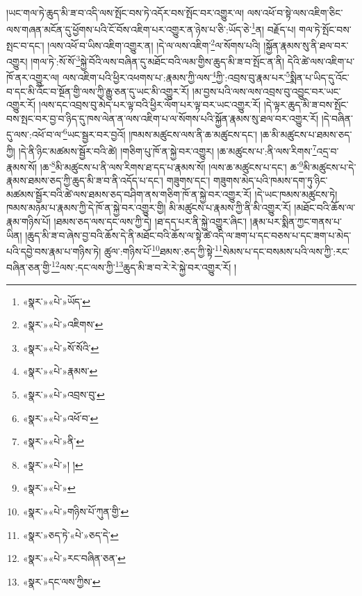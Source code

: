 །ཡང་གལ་ཏེ་ཆུད་མི་ཟ་བ་འདི་ལས་སྤོང་བས་ཏེ་འདོར་བས་སྤོང་བར་འགྱུར་ལ། ལས་འཕོ་བ་སྟེ་ལས་འཇིག་ཅིང་ལས་གཞན་མངོན་དུ་ཕྱོགས་པའི་ངོ་བོས་འཇིག་པར་འགྱུར་ན་ཉེས་པ་ཅི་:ཡོད་ཅེ་\footnote{«སྣར་»«པེ་»ཡོད་}ན། བརྗོད་པ། གལ་ཏེ་སྤོང་བས་སྤང་བ་དང་། །ལས་འཕོ་བ་ཡིས་འཇིག་འགྱུར་ན། །དེ་ལ་ལས་འཇིག་\footnote{«སྣར་»«པེ་»འཇིགས་}ལ་སོགས་པའི། །སྐྱོན་རྣམས་སུ་ནི་ཐལ་བར་འགྱུར། །གལ་ཏེ་:སོ་སོ་\footnote{«སྣར་»«པེ་»སོ་སོའི་}སྐྱེ་བོའི་ལས་བཞིན་དུ་མཐོང་བའི་ལམ་གྱིས་ཆུད་མི་ཟ་བ་སྤོང་ན་ནི། དེའི་ཚེ་ལས་འཇིག་པ་ཁོ་ནར་འགྱུར་ལ། ལས་འཇིག་པའི་ཕྱིར་འཕགས་པ་:རྣམས་ཀྱི་ལས་\footnote{«སྣར་»«པེ་»རྣམས་}ཀྱི་:འབྲས་བུ་རྣམ་པར་\footnote{«སྣར་»«པེ་»འབྲས་བུ་}སྨིན་པ་ཡིད་དུ་འོང་བ་དང་མི་འོང་བ་སྔོན་གྱི་ལས་ཀྱི་རྒྱུ་ཅན་དུ་ཡང་མི་འགྱུར་རོ། །མ་བྱས་པའི་ལས་ལས་འབྲས་བུ་འབྱུང་བར་ཡང་འགྱུར་རོ། །ལས་དང་འབྲས་བུ་མེད་པར་ལྟ་བའི་ཕྱིར་ལོག་པར་ལྟ་བར་ཡང་འགྱུར་རོ། །དེ་ལྟར་ཆུད་མི་ཟ་བས་སྤོང་བས་སྤང་བར་བྱ་བ་ཉིད་དུ་ཁས་ལེན་ན་ལས་འཇིག་པ་ལ་སོགས་པའི་སྐྱོན་རྣམས་སུ་ཐལ་བར་འགྱུར་རོ། །དེ་བཞིན་དུ་ལས་:འཕོ་བ་ལ་\footnote{«སྣར་»«པེ་»འཕོ་བ་}ཡང་སྦྱར་བར་བྱའོ། །ཁམས་མཚུངས་ལས་ནི་ཆ་མཚུངས་དང་། །ཆ་མི་མཚུངས་པ་ཐམས་ཅད་ཀྱི། །དེ་ནི་ཉིང་མཚམས་སྦྱོར་བའི་ཚེ། །གཅིག་པུ་ཁོ་ན་སྐྱེ་བར་འགྱུར། །ཆ་མཚུངས་པ་:ནི་ལས་རིགས་\footnote{«སྣར་»«པེ་»ནི་}འདྲ་བ་རྣམས་སོ། །ཆ་\footnote{«སྣར་»«པེ་»། །}མི་མཚུངས་པ་ནི་ལས་རིགས་ཐ་དད་པ་རྣམས་སོ། །ལས་ཆ་མཚུངས་པ་དང་། ཆ་\footnote{«སྣར་»«པེ་»}མི་མཚུངས་པ་དེ་རྣམས་ཐམས་ཅད་ཀྱི་ཆུད་མི་ཟ་བ་ནི་འདོད་པ་དང་། གཟུགས་དང་། གཟུགས་མེད་པའི་ཁམས་དག་ཏུ་ཉིང་མཚམས་སྦྱོར་བའི་ཚེ་ལས་ཐམས་ཅད་བཤིག་ནས་གཅིག་ཁོ་ན་སྐྱེ་བར་འགྱུར་རོ། །དེ་ཡང་ཁམས་མཚུངས་ཏེ། ཁམས་མཉམ་པ་རྣམས་ཀྱི་དེ་ཁོ་ན་སྐྱེ་བར་འགྱུར་གྱི། མི་མཚུངས་པ་རྣམས་ཀྱི་ནི་མི་འགྱུར་རོ། །མཐོང་བའི་ཆོས་ལ་རྣམ་གཉིས་པོ། །ཐམས་ཅད་ལས་དང་ལས་ཀྱི་དེ། །ཐ་དད་པར་ནི་སྐྱེ་འགྱུར་ཞིང་། །རྣམ་པར་སྨིན་ཀྱང་གནས་པ་ཡིན། །ཆུད་མི་ཟ་བ་ཞེས་བྱ་བའི་ཆོས་དེ་ནི་མཐོང་བའི་ཆོས་ལ་སྟེ་ཚེ་འདི་ལ་ཟག་པ་དང་བཅས་པ་དང་ཟག་པ་མེད་པའི་དབྱེ་བས་རྣམ་པ་གཉིས་ཏེ། ཚུལ་:གཉིས་པོ་\footnote{«སྣར་»«པེ་»གཉིས་པོ་ཀུན་གྱི་}ཐམས་:ཅད་ཀྱི་སྟེ་\footnote{«སྣར་»ཅད་ཏེ་«པེ་»ཅད་དེ་}སེམས་པ་དང་བསམས་པའི་ལས་ཀྱི་:རང་བཞིན་ཅན་གྱི་\footnote{«སྣར་»«པེ་»རང་བཞིན་ཅན་}ལས་:དང་ལས་ཀྱི་\footnote{«སྣར་»དང་ལས་ཀྱིས་}ཆུད་མི་ཟ་བ་རེ་རེ་སྐྱེ་བར་འགྱུར་རོ། །
